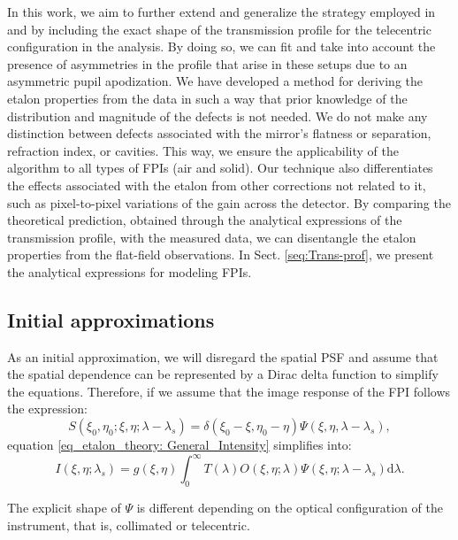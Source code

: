 In this work, we aim to further extend and generalize the strategy employed in \cite{crisp-method} and \cite{schamer_method} by including the exact shape of the transmission profile for the telecentric configuration in the analysis. By doing so, we can fit and take into account the presence of asymmetries in the profile that arise in these setups due to an asymmetric pupil apodization. We have developed a method for deriving the etalon properties from the data in such a way that prior knowledge of the distribution and magnitude of the defects is not needed. We do not make any distinction between defects associated with the mirror's flatness or separation, refraction index, or cavities. This way, we ensure the applicability of the algorithm to all types of FPIs (air and solid). Our technique also differentiates the effects associated with the etalon from other corrections not related to it, such as pixel-to-pixel variations of the gain across the detector. By comparing the theoretical prediction, obtained through the analytical expressions of the transmission profile, with the measured data, we can disentangle the etalon properties from the flat-field observations. In Sect. \ref{seq:Trans-prof}, we present the analytical expressions for modeling FPIs.

\subsection{\label{eta_corr_susec: etalon_transmission}Initial approximations}

As an initial approximation, we will disregard the spatial PSF and assume that the spatial dependence can be represented by a Dirac delta function to simplify the equations. Therefore, if we assume that the image response of the FPI follows the expression:
\begin{equation}
S\left(\xi_0, \eta_0; \xi , \eta; \lambda-\lambda_{s}\right)=\delta(\xi_0-\xi,\eta_0-\eta)\Psi(\xi,\eta,\lambda-\lambda_s),
\end{equation}
equation \eqref{eq_etalon_theory: General_Intensity} simplifies into:
\begin{equation}
    I\left(\xi, \eta ; \lambda_{s}\right)=g(\xi, \eta)\int_{0}^{\infty} T(\lambda)  O\left(\xi, \eta ; \lambda\right) \Psi\left(\xi, \eta ; \lambda-\lambda_{s}\right)  \mathrm{d} \lambda.
    \label{eq_eta_corr: intensity}
\end{equation}



The explicit shape of $\Psi$ is different depending on the optical configuration of the instrument, that is, collimated or telecentric.

